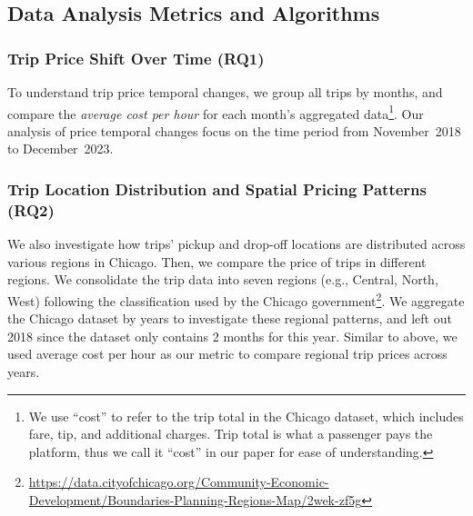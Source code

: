 \subsection{Data Analysis Metrics and Algorithms}
\subsubsection{Trip Price Shift Over Time (RQ1)}
To understand trip price temporal changes, we group all trips by months, and compare the \emph{average cost per hour} for each month's aggregated data\footnote{We use ``cost'' to refer to the trip total in the Chicago dataset, which includes fare, tip, and additional charges. Trip total is what a passenger pays the platform, thus we call it ``cost'' in our paper for ease of understanding.}. Our analysis of price temporal changes focus on the time period from November~2018 to December~2023.


\subsubsection{Trip Location Distribution and Spatial Pricing Patterns (RQ2)}
We also investigate how trips' pickup and drop-off locations are distributed across various regions in Chicago. Then, we compare the price of trips in different regions. We consolidate the trip data into seven regions (e.g., Central, North, West) following the classification used by the Chicago government\footnote{\url{https://data.cityofchicago.org/Community-Economic-Development/Boundaries-Planning-Regions-Map/2wek-zf5g}}. We aggregate the Chicago dataset by years to investigate these regional patterns, and left out 2018 since the dataset only contains 2 months for this year. Similar to above, we used average cost per hour as our metric to compare regional trip prices across years. 




